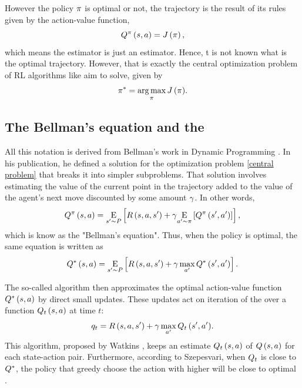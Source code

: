 \documentclass[conference]{IEEEtran}
\begin{document}
However the policy $\pi$ is optimal or not, the trajectory is the result of its rules given by the action-value function,
\begin{equation}
    \Qf[^{\policy}] = \expectedreturn,
    \label{on-policy action-value}
\end{equation}
which means the estimator is just an estimator.
Hence, t is not known what is the optimal trajectory.
However, that is exactly the central optimization problem of RL algorithms like {\Qlearning} aim to solve, given by
\begin{equation}
    \optimalpolicy = \argmax_{\policy}{\expectedreturn}.
    \label{central problem}
\end{equation}


\subsection{The Bellman's equation and the \Qagent}\label{qagent}

All this notation is derived from Bellman's work in Dynamic Programming \cite{Bellman:DynamicProgramming}.
In his publication, he defined a solution for the optimization problem \eqref{central problem} that breaks it into simpler subproblems.
That solution involves estimating the value of the current point in the trajectory added to the value of the agent's next move discounted by some amount $\gamma$.
In other words,
\begin{equation}
    \Qfpolicy = \Expected[\nextstate \sim P]{\rewardf + \discountfactor \Expected[\nextaction \sim \policy]{\nextQfpolicy}},
    \label{bellman}
\end{equation}
which is know as the "Bellman's equation".
Thus, when the policy is optimal, the same equation is written as
\begin{equation}
    \Qfoptimal = \Expected[\nextstate \sim P]{\rewardf + \discountfactor \max_{\nextaction}{\nextQfoptimal}}.
    \label{optimal bellman}
\end{equation}

The so-called {\Qagent} algorithm then approximates the optimal action-value function $\Qfoptimal$ by direct small updates.
These updates act on iteration of the {\Qvalues} over a function $\Qftarget$ at time $t$:
\begin{equation}
    \qtarget = \rewardf + \discountfactor \max_{\nextaction}{\nextQftarget}.
    \label{qtarget}
\end{equation}
This {\Qlearning} algorithm, proposed by Watkins \cite{Watkins:1989}, keeps an estimate $\Qftarget$ of $\Qf$ for each state-action pair.
Furthermore, according to Szepesvari, when $\Qtarget$ is close to $\Qoptimal$, the policy that greedy choose the action with higher {\Qvalue} will be close to optimal \cite{Szepesvari:2010}.
\end{document}
